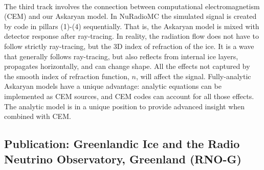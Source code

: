 \documentclass[../../../main.tex]{subfiles}
\begin{document}
\\
\vspace{0.15cm}
The third track involves the connection between computational electromagnetism (CEM) and our Askaryan model. In NuRadioMC the simulated signal is created by code in pillars (1)-(4) sequentially. That is, the Askaryan model is mixed with detector response after ray-tracing. In reality, the radiation flow does not have to follow strictly ray-tracing, but the 3D index of refraction of the ice. It is a wave that generally follows ray-tracing, but also reflects from internal ice layers, propagates horizontally, and can change shape. All the effects not captured by the smooth index of refraction function, $n$, will affect the signal.  Fully-analytic Askaryan models have a unique advantage: analytic equations can be implemented as CEM sources, and CEM codes can account for all those effects. The analytic model is in a unique position to provide advanced insight when combined with CEM.

\subsection{Publication: Greenlandic Ice and the Radio Neutrino Observatory, Greenland (RNO-G)}
\end{document}
